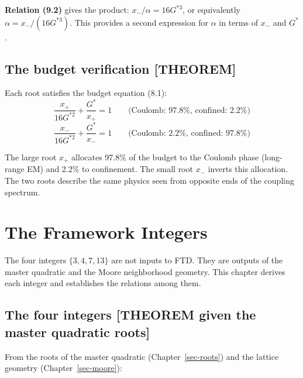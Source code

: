 \documentclass[
  11pt,
  letterpaper,
  twoside,
  openany]{book}
\makeatletter
\let\orig@section\section
\renewcommand{\section}{\needspace{8\baselineskip}\orig@section}
\newcommand{\Gs}{G^{*}{}}
\newcommand{\Gssq}{G^{*2}{}}      %
\newcommand{\Gscu}{G^{*3}{}}      %
\makeatother
\begin{document}
\textbf{Relation (9.2)} gives the product: \(x_- / \alpha = 16\Gscu\),
or equivalently \(\alpha = x_- / (16\Gscu)\). This provides a second
expression for \(\alpha\) in terms of \(x_-\) and \(\Gs\).

\section{The budget verification
{[}THEOREM{]}}\label{the-budget-verification-theorem}

Each root satisfies the budget equation (8.1): \[
\frac{x_+}{16\Gssq} + \frac{\Gs}{x_+} = 1 \qquad \text{(Coulomb: 97.8\%, confined: 2.2\%)}
\] \[
\frac{x_-}{16\Gssq} + \frac{\Gs}{x_-} = 1 \qquad \text{(Coulomb: 2.2\%, confined: 97.8\%)}
\]

The large root \(x_+\) allocates 97.8\% of the budget to the Coulomb
phase (long-range EM) and 2.2\% to confinement. The small root \(x_-\)
inverts this allocation. The two roots describe the same physics seen
from opposite ends of the coupling spectrum.

\chapter{The Framework Integers}\label{sec-integers}

The four integers \(\{3, 4, 7, 13\}\) are not inputs to FTD. They are
outputs of the master quadratic and the Moore neighborhood geometry.
This chapter derives each integer and establishes the relations among
them.

\section{The four integers {[}THEOREM given the master quadratic
roots{]}}\label{the-four-integers-theorem-given-the-master-quadratic-roots}

From the roots of the master quadratic (Chapter~\ref{sec-roots}) and the
lattice geometry (Chapter~\ref{sec-moore}):
\end{document}
